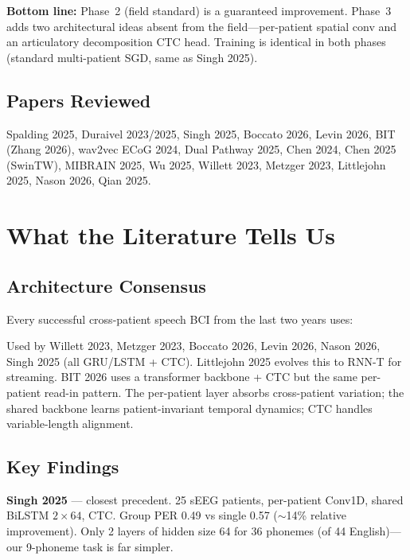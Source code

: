 \documentclass[11pt, letterpaper]{article}
\begin{document}
\textbf{Bottom line:} Phase~2 (field standard) is a guaranteed improvement. Phase~3 adds two architectural ideas absent from the field---per-patient spatial conv and an articulatory decomposition CTC head. Training is identical in both phases (standard multi-patient SGD, same as Singh 2025).

\subsection{Papers Reviewed}

Spalding 2025, Duraivel 2023/2025, Singh 2025, Boccato 2026, Levin 2026, BIT (Zhang 2026), wav2vec ECoG 2024, Dual Pathway 2025, Chen 2024, Chen 2025 (SwinTW), MIBRAIN 2025, Wu 2025, Willett 2023, Metzger 2023, Littlejohn 2025, Nason 2026, Qian 2025.


\section{What the Literature Tells Us}
\label{sec:lit}

\subsection{Architecture Consensus}

Every successful cross-patient speech BCI from the last two years uses:

\begin{center}
\end{center}

Used by Willett 2023, Metzger 2023, Boccato 2026, Levin 2026, Nason 2026, Singh 2025 (all GRU/LSTM + CTC). Littlejohn 2025 evolves this to RNN-T for streaming. BIT 2026 uses a transformer backbone + CTC but the same per-patient read-in pattern. The per-patient layer absorbs cross-patient variation; the shared backbone learns patient-invariant temporal dynamics; CTC handles variable-length alignment.

\subsection{Key Findings}

\textbf{Singh 2025} --- closest precedent. 25 sEEG patients, per-patient Conv1D, shared BiLSTM $2\times64$, CTC. Group PER 0.49 vs single 0.57 (${\sim}$14\% relative improvement). Only 2 layers of hidden size 64 for 36 phonemes (of 44 English)---our 9-phoneme task is far simpler.
\end{document}
